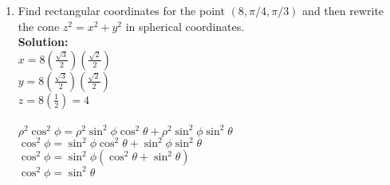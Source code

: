 \documentclass[11pt]{article}
\begin{document}
\begin{enumerate}
    
    \item Find rectangular coordinates for the point $(8,\pi/4, \pi/3)$ and then rewrite the cone $z^2 = x^2 + y^2$ in spherical coordinates.  
\\
\textbf{Solution:}
\\
$x=8(\frac{\sqrt{3}}{2})(\frac{\sqrt{2}}{2})$
\\
$y=8(\frac{\sqrt{3}}{2})(\frac{\sqrt{2}}{2})$
\\
$z=8(\frac{1}{2})=4$
\\ \\
$\rho^2\cos^2 \phi =\rho^2\sin^2 \phi \cos^2 \theta + \rho^2 \sin^2 \phi \sin^2 \theta $
\\
$\cos^2 \phi = \sin^2 \phi \cos^2 \theta + \sin^2 \phi \sin^2 \theta$
\\
$\cos^2 \phi = \sin^2 \phi (\cos^2 \theta + \sin^2 \theta)$
\\
$\cos^2 \phi = \sin^2 \theta$




\end{enumerate}
\end{document}
